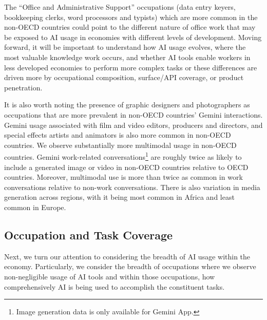 \documentclass[11pt,a4paper]{article}
\begin{document}
The ``Office and Administrative Support'' occupations (data entry keyers, bookkeeping clerks, word processors and typists) which are more common in the non-OECD countries could point to the different nature of office work that may be exposed to AI usage in economies with different levels of development. Moving forward, it will be important to understand how AI usage evolves, where the most valuable knowledge work occurs, and whether AI tools enable workers in less developed economies to perform more complex tasks or these differences are driven more by occupational composition, surface/API coverage, or product penetration.

It is also worth noting the presence of graphic designers and photographers as occupations that are more prevalent in non-OECD countries' Gemini interactions. Gemini usage associated with film and video editors, producers and directors, and special effects artists and animators is also more common in non-OECD countries. We observe substantially more multimodal usage in non-OECD countries. Gemini work-related conversations\footnote{Image generation data is only available for Gemini App.} are roughly twice as likely to include a generated image or video in non-OECD countries relative to OECD countries. Moreover, multimodal use is more than twice as common in work conversations relative to non-work conversations. There is also variation in media generation across regions, with it being most common in Africa and least common in Europe.

\subsection{Occupation and Task Coverage}

Next, we turn our attention to considering the breadth of AI usage within the economy. Particularly, we consider the breadth of occupations where we observe non-negligible usage of AI tools and within those occupations, how comprehensively AI is being used to accomplish the constituent tasks.
\end{document}
